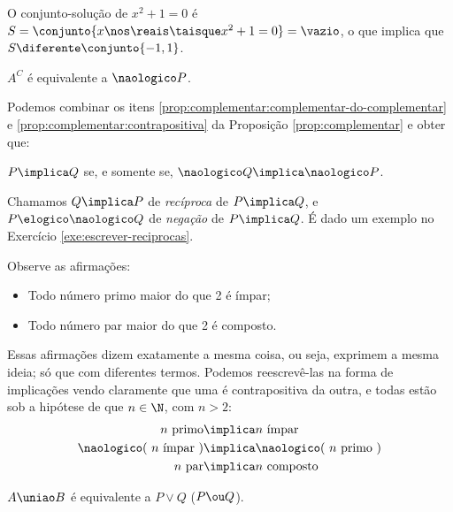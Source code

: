 \begin{solution}
	O conjunto-solução de $x^2 + 1 = 0$ é $S = \conjunto{ x \nos \reais \taisque x^2 + 1 = 0} = \vazio$, o que implica que $S \diferente \conjunto{-1, 1}$.
\end{solution}

\begin{proposition} 
	$A^C$ é equivalente a $\naologico P$.
\end{proposition}

Podemos combinar os itens \ref{prop:complementar:complementar-do-complementar} e \ref{prop:complementar:contrapositiva} da Proposição \ref{prop:complementar} e obter que:
\begin{center}
    $P \implica Q$ se, e somente se, $\naologico Q \implica \naologico P$.
\end{center}

Chamamos $Q \implica P$ de \emph{recíproca} de $P \implica Q$, e $P \elogico \naologico Q$ de \emph{negação} de $P \implica Q$. É dado um exemplo no Exercício \ref{exe:escrever-reciprocas}.

\begin{example}
	Observe as afirmações:
	
	\begin{itemize}
		\item Todo número primo maior do que 2 é ímpar;
		\item Todo número par maior do que 2 é composto.
	\end{itemize}

	Essas afirmações dizem exatamente a mesma coisa, ou seja, exprimem a mesma ideia; só que com diferentes termos. Podemos reescrevê-las na forma de implicações vendo claramente que uma é contrapositiva da outra, e todas estão sob a hipótese de que $n \in \N$, com $n > 2$:    
    \begin{align*}
        \text{$n$ primo}                   &\implica \text{$n$ ímpar} \\
        \text{$\naologico$( $n$ ímpar )}   &\implica \text{$\naologico$( $n$ primo )} \\
        \text{$n$ par}                     &\implica \text{$n$ composto}
    \end{align*}
\end{example}

\begin{proposition}
	$A \uniao B$ é equivalente a $P \lor Q$ ($P \ou Q$).
\end{proposition}


